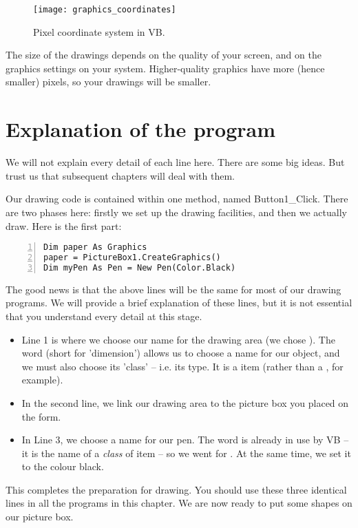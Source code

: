 		\begin{figure}[ht]
			\centering
			\texttt{[image: graphics\_coordinates]}
			\caption{Pixel coordinate system in VB.}
			\label{fig:graphics_coordinates}
		\end{figure}


		The size of the drawings depends on the quality of your screen, and on the graphics settings on your system. Higher-quality graphics have more (hence smaller) pixels, so your drawings will be smaller.

	\section{Explanation of the program}
		We will not explain every detail of each line here. There are some big ideas. But trust us that subsequent chapters will deal with them.

		Our drawing code is contained within one method, named Button1\_Click. There are two phases here: firstly we set up the drawing facilities, and then we actually draw. Here is the first part:
		\begin{lstlisting}[numbers=left]
Dim paper As Graphics
paper = PictureBox1.CreateGraphics()
Dim myPen As Pen = New Pen(Color.Black)
		\end{lstlisting}

		The good news is that the above lines will be the same for most of our drawing programs. We will provide a brief explanation of these lines, but it is not essential that you understand every detail at this stage.
		\begin{itemize}
			\item Line 1 is where we choose our name for the drawing area (we chose ). The word  (short for 'dimension') allows us to choose a name for our object, and we must also choose its 'class' – i.e. its type. It is a  item (rather than a , for example).
			\item In the second line, we link our drawing area to the picture box you placed on the form.
			\item In Line 3, we choose a name for our pen. The word  is already in use by VB – it is the name of a \emph{class} of item – so we went for . At the same time, we set it to the colour black.
		\end{itemize}
		This completes the preparation for drawing. You should use these three identical lines in all the programs in this chapter. We are now ready to put some shapes on our picture box.

